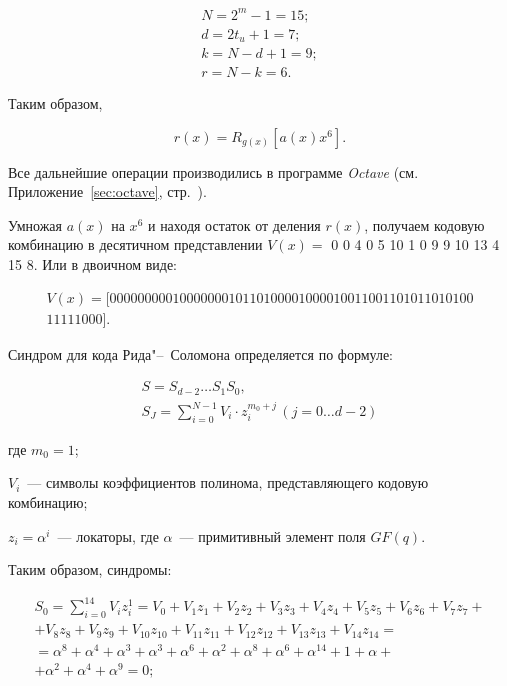 \begin{gather*}
  N = 2^m - 1 = 15;\\
  d = 2t_u + 1 = 7;\\
  k = N - d + 1 = 9;\\
  r = N - k = 6.
\end{gather*}

Таким образом,

\begin{equation*}
  r(x) = R_{g(x)}\left[a(x)x^6\right].
\end{equation*}

Все дальнейшие операции производились в программе \textit{Octave}
(см. Приложение~\ref{sec:octave}, стр.~\pageref{page3}).

Умножая $a(x)$ на $x^6$ и находя остаток от деления $r(x)$, получаем
кодовую комбинацию в десятичном представлении
$V(x) =$ 0    0    4    0    5   10    1    0    9    9   10   13    4
15    8. Или в двоичном виде:

\begin{gather*}
  V(x) = [0000000001000000010110100001000010011001101011010100\\
  11111000].
\end{gather*}

Синдром для кода Рида"--~Соломона определяется по формуле:

\begin{gather*}
  S = S_{d-2} \ldots S_1S_0,\\
  S_J = \sum _{i=0} ^{N-1} V_i \cdot z_i^{m_0+j} \, (j = 0
  \ldots d-2)
\end{gather*}

\begin{ESKDexplanation}
\item[где ] $m_0 = 1$;
\item $V_i$~--- символы коэффициентов полинома, представляющего
  кодовую комбинацию;
\item $z_i = \alpha^i$~--- локаторы, где $\alpha$~--- примитивный
  элемент поля $GF(q)$.
\end{ESKDexplanation}

Таким образом, синдромы:

\begin{gather*}
  S_0 = \sum_{i = 0}^{14}V_iz_i^1 = V_0 + V_1z_1 + V_2z_2 + V_3z_3 +
  V_4z_4 + V_5z_5 + V_6z_6 + V_7z_7 + \\ + V_8z_8 + V_9z_9 +
  V_{10}z_{10} + V_{11}z_{11} + V_{12}z_{12} + V_{13}z_{13} +
  V_{14}z_{14} =  \\ = \alpha^8 + \alpha^4 + \alpha^3 + \alpha^3 +
  \alpha^6 + \alpha^2 + \alpha^8 + \alpha^6 + \alpha^{14} + 1 + \alpha
  + \\ + \alpha^2 + \alpha^4 + \alpha^9 = 0;
\end{gather*}

